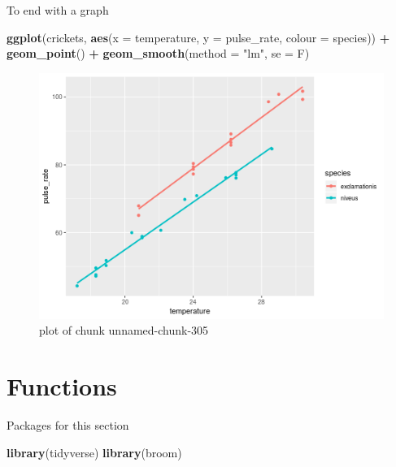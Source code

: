 \documentclass[ignorenonframetext,]{beamer}
\newenvironment{Shaded}{\begin{snugshade}}{\end{snugshade}}
\newcommand{\DataTypeTok}[1]{\textcolor[rgb]{0.13,0.29,0.53}{#1}}
\newcommand{\KeywordTok}[1]{\textcolor[rgb]{0.13,0.29,0.53}{\textbf{#1}}}
\newcommand{\NormalTok}[1]{#1}
\newcommand{\OperatorTok}[1]{\textcolor[rgb]{0.81,0.36,0.00}{\textbf{#1}}}
\newcommand{\StringTok}[1]{\textcolor[rgb]{0.31,0.60,0.02}{#1}}
\begin{document}
\begin{frame}[fragile]{To end with a graph}
\protect\hypertarget{to-end-with-a-graph}{}

\begin{Shaded}
\begin{Highlighting}[]
\KeywordTok{ggplot}\NormalTok{(crickets, }\KeywordTok{aes}\NormalTok{(}\DataTypeTok{x =}\NormalTok{ temperature, }\DataTypeTok{y =}\NormalTok{ pulse_rate,}
  \DataTypeTok{colour =}\NormalTok{ species)) }\OperatorTok{+}
\StringTok{  }\KeywordTok{geom_point}\NormalTok{() }\OperatorTok{+}\StringTok{ }\KeywordTok{geom_smooth}\NormalTok{(}\DataTypeTok{method =} \StringTok{"lm"}\NormalTok{, }\DataTypeTok{se =}\NormalTok{ F)}
\end{Highlighting}
\end{Shaded}

\begin{figure}
\centering
\includegraphics{figure/unnamed-chunk-305-1.png}
\caption{plot of chunk unnamed-chunk-305}
\end{figure}

\end{frame}

\hypertarget{functions}{%
\section{Functions}\label{functions}}

\begin{frame}[fragile]{Packages for this section}
\protect\hypertarget{packages-for-this-section-8}{}

\begin{Shaded}
\begin{Highlighting}[]
\KeywordTok{library}\NormalTok{(tidyverse)}
\KeywordTok{library}\NormalTok{(broom)}
\end{Highlighting}
\end{Shaded}

\end{frame}
\end{document}
